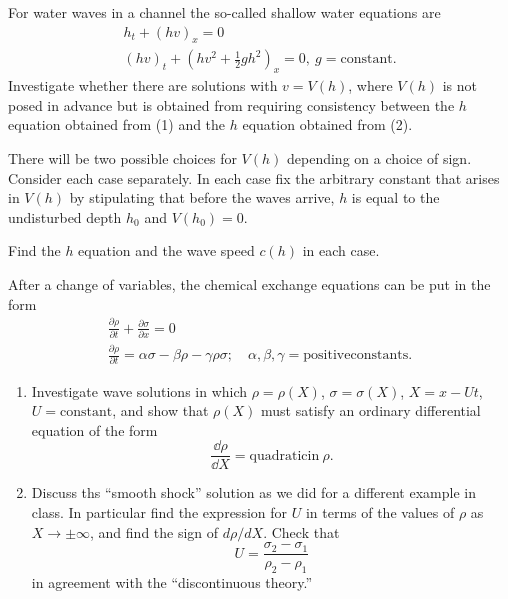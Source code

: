\begin{Exercise}
  For water waves in a channel the so-called shallow water equations are
  \begin{gather}
    h_t + (hv)_x = 0 \\
    (hv)_t + \left(hv^2 + \frac{1}{2} gh^2 \right)_x = 0, \ g = \mathrm{constant}.
  \end{gather}
  Investigate whether there are solutions with $v=V(h)$, where $V(h)$ is
  not posed in advance but is obtained from requiring consistency between the
  $h$ equation obtained from (1) and the $h$ equation obtained from (2).

  There will be two possible choices for $V(h)$ depending on a choice of sign.
  Consider each case separately.  In each case fix the arbitrary constant
  that arises in $V(h)$ by stipulating that before the waves arrive, $h$
  is equal to the undisturbed depth $h_0$ and $V(h_0)=0$.

  Find the $h$ equation and the wave speed $c(h)$ in each case.
\end{Exercise}



\begin{Exercise}
  After a change of variables, the chemical exchange equations can be put
  in the form
  \begin{gather}
    \frac{\partial \rho}{\partial t} + \frac{\partial \sigma}{\partial x} = 0 \\
    \frac{\partial \rho}{\partial t} = \alpha \sigma - \beta \rho - \gamma \rho \sigma; \quad
    \alpha, \beta, \gamma = \mathrm{positive constants.}
  \end{gather}
  \begin{enumerate}
  \item
    Investigate wave solutions in which $\rho = \rho(X)$, $\sigma=\sigma(X)$,
    $X=x-Ut$, $U=\mathrm{constant}$, and show that $\rho(X)$ must satisfy
    an ordinary differential equation of the form
    \[ \frac{\dd \rho}{\dd X} = \mathrm{quadratic in}\ \rho. \]
  \item
    Discuss ths ``smooth shock'' solution as we did for a different example
    in class.  In particular find the expression for $U$ in terms of the 
    values of $\rho$ as $X \to \pm \infty$, and find the sign of $d\rho/dX$.
    Check that
    \[ U = \frac{\sigma_2-\sigma_1}{\rho_2-\rho_1} \]
    in agreement with the ``discontinuous theory.''
  \end{enumerate}
\end{Exercise}




